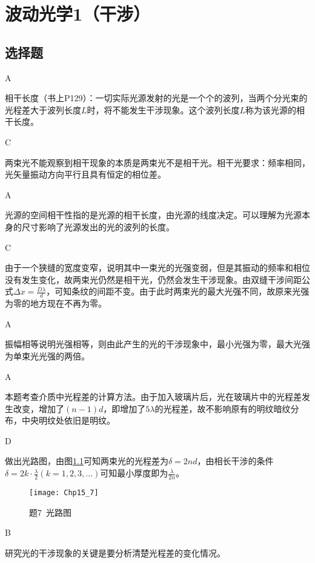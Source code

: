 \chapter{波动光学1（干涉）}
\makeatletter
{}
\makeatother
\section{选择题}
\exercise A

\solve 相干长度（书上P129）：一切实际光源发射的光是一个个的波列，当两个分光束的光程差大于波列长度$L$时，将不能发生干涉现象。这个波列长度$L$称为该光源的相干长度。 

\exercise C

\solve 两束光不能观察到相干现象的本质是两束光不是相干光。相干光要求：频率相同，光矢量振动方向平行且具有恒定的相位差。

\exercise A

\solve 光源的空间相干性指的是光源的相干长度，由光源的线度决定。可以理解为光源本身的尺寸影响了光源发出的光的波列的长度。

\exercise C

\solve 由于一个狭缝的宽度变窄，说明其中一束光的光强变弱，但是其振动的频率和相位没有发生变化，故两束光仍然是相干光，仍然会发生干涉现象。由双缝干涉间距公式$\Delta x=\frac{D\lambda}{d}$，可知条纹的间距不变。由于此时两束光的最大光强不同，故原来光强为零的地方现在不再为零。

\exercise A

\solve 振幅相等说明光强相等，则由此产生的光的干涉现象中，最小光强为零，最大光强为单束光光强的两倍。

\exercise A

\solve 本题考查介质中光程差的计算方法。由于加入玻璃片后，光在玻璃片中的光程差发生改变，增加了$(n-1)d$，即增加了$5\lambda$的光程差，故不影响原有的明纹暗纹分布，中央明纹处依旧是明纹。

\exercise D

\solve 做出光路图，由图\ref{fig:15_7}可知两束光的光程差为$\delta=2nd$，由相长干涉的条件$\delta=2k\cdot\frac{\lambda}{2}(k=1,2,3,...)$可知最小厚度即为$\frac{\lambda}{2n}$。
\begin{figure}[!h]
	\centering
	\texttt{[image: Chp15\_7]}
	\caption{题7\ 光路图}\label{fig:15_7}
\end{figure}

\exercise B

\solve 研究光的干涉现象的关键是要分析清楚光程差的变化情况。


